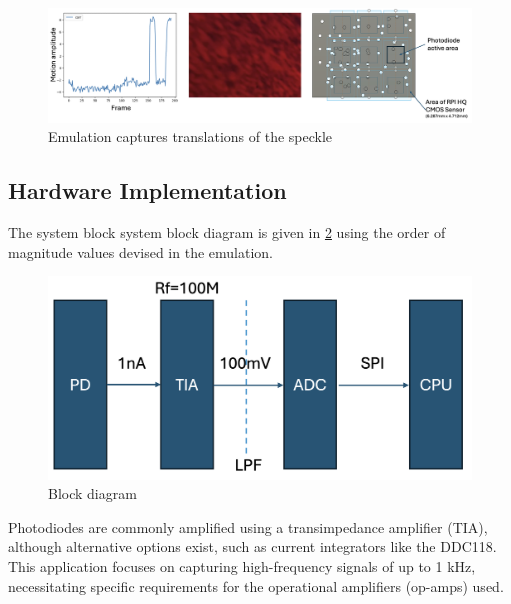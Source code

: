\begin{figure}[t]
  \centering
  \includegraphics[width=\widthnarrow]{figures/impl/emulated2.png}
  \caption{Emulation captures translations of the speckle}
  \label{fig:emulated2}
\end{figure}



\subsection{Hardware Implementation}

The system block system block diagram is given in \ref{fig:block} using the order of magnitude values devised in the emulation.
\begin{figure}[t]
  \centering
  \includegraphics[width=\widthnarrow]{figures/impl/block_diagram.png}
  \caption{Block diagram}
  \label{fig:block}
\end{figure}

Photodiodes are commonly amplified using a transimpedance amplifier (TIA), although alternative options exist, such as current integrators like the DDC118. This application focuses on capturing high-frequency signals of up to 1 kHz, necessitating specific requirements for the operational amplifiers (op-amps) used.

